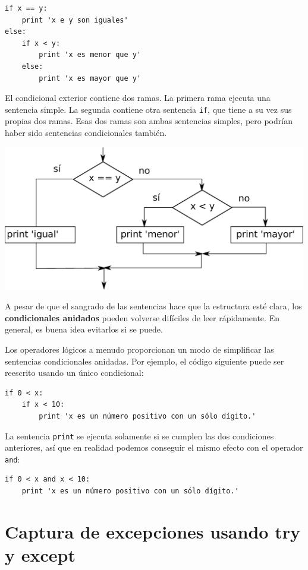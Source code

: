 \beforeverb
\begin{verbatim}
if x == y:
    print 'x e y son iguales'
else:
    if x < y:
        print 'x es menor que y'
    else:
        print 'x es mayor que y'
\end{verbatim}
\afterverb
%
El condicional exterior contiene dos ramas. La
primera rama ejecuta una sentencia simple. La segunda
contiene otra sentencia {\tt if}, que tiene a su vez sus propias
dos ramas. Esas dos ramas son ambas sentencias simples,
pero podrían haber sido sentencias condicionales también.

\beforefig
\centerline{\includegraphics[height=2.50in]{figs2/nested.eps}}
\afterfig

A pesar de que el sangrado de las sentencias hace que la estructura
esté clara, los {\bf condicionales anidados} pueden volverse difíciles
de leer rápidamente. En general, es buena idea evitarlos si se puede.

Los operadores lógicos a menudo proporcionan un modo de simplificar las
sentencias condicionales anidadas. Por ejemplo, el código siguiente
puede ser reescrito usando un único condicional:

\beforeverb
\begin{verbatim}
if 0 < x:
    if x < 10:
        print 'x es un número positivo con un sólo dígito.'
\end{verbatim}
\afterverb
%
La sentencia {\tt print} se ejecuta solamente si se cumplen las dos condiciones
anteriores, así que en realidad podemos conseguir el mismo efecto con el operador {\tt and}:

\beforeverb
\begin{verbatim}
if 0 < x and x < 10:
    print 'x es un número positivo con un sólo dígito.'
\end{verbatim}
\afterverb


\section{Captura de excepciones usando try y except}
\label{catch1}


